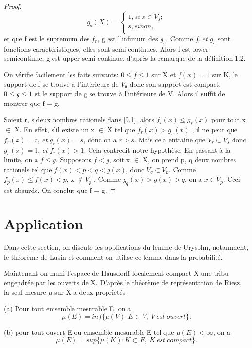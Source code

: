 \documentclass{article}
\begin{document}
\begin{proof}
   \[ 
   g_{s}(X)=
   \begin{cases}
   1, si\ x \in \overline{V}_{s}; \\
   s, sinon, \\   
   \end{cases}
\]
et que f est le supremum des $f_{r}$, g est l'infimum des $g_{s}$. Comme $f_{r} \ et \ g_{s}$ sont fonctions caractéristiques, elles sont semi-continues. Alors f est lower semicontinue, g est upper semi-continue, d'après la remarque de la définition 1.2. \par
On vérifie facilement les faits suivants: $0 \leq f \leq 1$ sur X et $f(x)=1$ sur K, le support de f se trouve à l'intérieure de $\overline{V}_{0}$ donc son support est compact. $0 \leq g \leq 1$ et le support de g se trouve à l'intérieure de V. Alors il suffit de montrer que f = g.\par 
Soient r, s deux nombres rationels dans [0,1], alors $f_{r}(x) \leq  g_{s}(x)$ pour tout x $\in$ X. En effet, s'il existe un x $\in$ X tel que $f_{r}(x) > g_{s}(x)$ , il ne peut que $f_{r}(x)=r, \ et \  g_{s} (x)= s $, donc on a $r > s$. Mais cela entraine que $V_{r} \subset V_{s}$ donc $g_{s}(x) =1, \ et \ f_{r}(x) > 1$. Cela contredit notre hypothèse. 
En passant à la limite, on a $f \leq g$. Supposons $f < g$,  soit x $\in$ X, on prend p, q deux nombres rationels tel que $ f(x)< p < q < g(x) $, donc $\overline{V}_{q} \subset V_{p}$. 
Comme $f_{p}(x) \leq f(x) < p$, x $\notin V_{p}$ . Comme $g_{q} (x) > g(x) > q$, on a $x \in \overline{V}_{p}$. Ceci est absurde. On conclut que f = g.     
\end{proof}

\section{Application}
Dans cette section, on discute les applications du lemme de Urysohn, notamment, le théorème de Lusin et comment on utilise ce lemme dans la probabilité. \par

Maintenant on muni l'espace de Hausdorff localement compact X une tribu engendrée par les ouverts de X. D'après le théorème de représentation de Riesz, la seul mesure $\mu$ sur X a deux proprietés:\par

(a) Pour tout emsemble mesurable E, on a 
\[\mu(E) = inf \{ \mu(V): E \subset V, \ V\ est\ ouvert \}.\]

(b) pour tout ouvert E ou emsemble mesurable E tel que $\mu(E) < \infty$, on a 
\[\mu(E) = sup \{ \mu(K): K \subset E, \ K\ est \ compact \}.\]
\end{document}

